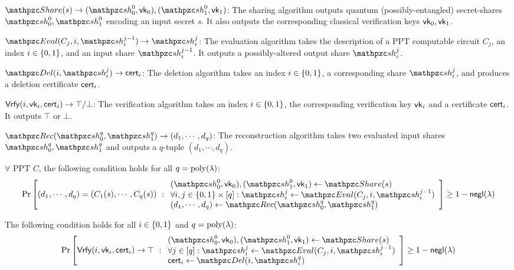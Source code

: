 \begin{description}

\item [Syntax:] $ $
\item $\Sh(s) \rightarrow (\qsh_0^0, \vk_0), (\qsh_1^0,
\vk_1)$: The sharing algorithm outputs quantum
(possibly-entangled) secret-shares $\qsh_0^0, \qsh_1^0$ encoding an
input secret $s$. It also outputs the corresponding classical
verification keys $\mathsf{vk}_0, \mathsf{vk}_1$.

\item $\Ev(C_j, i, \qsh_i^{j-1}) \rightarrow \qsh_i^{j}$: The
evaluation algorithm takes the description of a PPT computable
circuit $C_j$, an index $i \in \{0,1\}$, and an input share
$\qsh_i^{j-1}$. It outputs a possibly-altered output share
$\qsh_i^{j}$.

\item $\Del(i, \qsh_i^j) \rightarrow \cert_i$: The deletion
algorithm takes an index $i \in \{0,1\}$, a corresponding share
$\qsh_i^j$, and produces a deletion certificate $\mathsf{cert}_i$.

\item $\mathsf{Vrfy}(i, \mathsf{vk}_i, \mathsf{cert}_i) \rightarrow \top/\bot$: The
verification algorithm takes an index $i \in \{0,1\}$, the
corresponding verification key $\mathsf{vk}_i$ and a certificate $\mathsf{cert}_i$.
It outputs $\top$ or $\bot$.

\item $\Rec(\qsh_0^q, \qsh_1^q) \rightarrow (d_1, \cdots, d_q)$: The
reconstruction algorithm takes two evaluated input shares $\qsh_0^q,
\qsh_1^q$ and outputs a $q$-tuple $(d_1, \cdots, d_q)$.

\item [Evaluation Correctness:] $\forall$ PPT $C$, the following
    condition holds for all $q = {\mathrm{poly}}(\lambda)$:
\begin{align}
\Pr\left[
(d_1, \cdots, d_q) = (C_1(s), \cdots, C_q(s))
\ :
\begin{array}{ll}
(\qsh_0^0, \vk_0), (\qsh_1^0, \vk_1) \gets \Sh(s)\\
\forall i,j \in \bit \times [q]: \qsh_i^j \leftarrow \Ev(C_j, i,
\qsh_i^{j-1})\\
(d_1, \cdots, d_q) \leftarrow \Rec(\qsh_0^q, \qsh_1^q)
\end{array}
\right] \geq 1 - \negl(\secp)
\end{align}

\item [Deletion Correctness:] The following condition holds for
    all $i \in \{0,1\}$ and $q = {\mathrm{poly}}(\lambda)$:
\begin{align}
\Pr\left[
\Vrfy(i, \vk_i, \cert_i) \rightarrow \top
\ :
\begin{array}{ll}
(\qsh_0^0, \vk_0), (\qsh_1^0, \vk_1) \gets \Sh(s)\\
\forall j \in [q]: \qsh_i^j \leftarrow \Ev(C_j, i,
\qsh_i^{j-1})\\
\cert_i \leftarrow \Del(i, \qsh_i^q)
\end{array}
\right] \geq 1 - \negl(\secp)
\end{align}


\end{description}
